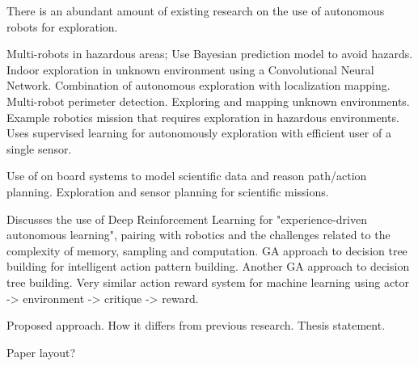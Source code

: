 There is an abundant amount of existing research on the use of autonomous robots for exploration.


\cite{christensen_multi-robot_2017} Multi-robots in hazardous areas; Use Bayesian prediction model to avoid hazards.
\cite{tai_autonomous_2017} Indoor exploration in unknown environment using a Convolutional Neural Network.
\cite{stachniss_exploration_2004} Combination of autonomous exploration with localization mapping.
\cite{clark_mobile_2007} Multi-robot perimeter detection.
\cite{perea_strom_robust_2017} Exploring and mapping unknown environments.
\cite{fink_tier-scalable_2007} Example robotics mission that requires exploration in hazardous environments.
\cite{bai_toward_2017} Uses supervised learning for autonomously exploration with efficient user of a single sensor.



\cite{arora_approach_2017} Use of on board systems to model scientific data and reason path/action planning.
\cite{hutter_online_2018} Exploration and sensor planning for scientific missions.




\cite{arulkumaran_brief_2017} Discusses the use of Deep Reinforcement Learning for "experience-driven autonomous learning", pairing with robotics and the challenges related to the complexity of memory, sampling and computation.
\cite{fu_genetic_2003} GA approach to decision tree building for intelligent action pattern building.
\cite{yi_new_2011} Another GA approach to decision tree building.
\cite{kiumarsi_optimal_2018} Very similar action reward system for machine learning using actor -> environment -> critique -> reward.


Proposed approach.
How it differs from previous research.
Thesis statement.


Paper layout?

